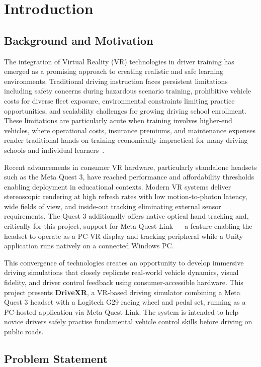 \chapter{Introduction}{\label{ch:intro}}
\section{Background and Motivation}

The integration of Virtual Reality (VR) technologies in driver training has emerged as a promising approach to creating realistic and safe learning environments. Traditional driving instruction faces persistent limitations including safety concerns during hazardous scenario training, prohibitive vehicle costs for diverse fleet exposure, environmental constraints limiting practice opportunities, and scalability challenges for growing driving school enrollment. These limitations are particularly acute when training involves higher-end vehicles, where operational costs, insurance premiums, and maintenance expenses render traditional hands-on training economically impractical for many driving schools and individual learners~\cite{Harari2021}.

Recent advancements in consumer VR hardware, particularly standalone headsets such as the Meta Quest 3, have reached performance and affordability thresholds enabling deployment in educational contexts. Modern VR systems deliver stereoscopic rendering at high refresh rates with low motion-to-photon latency, wide fields of view, and inside-out tracking eliminating external sensor requirements. The Quest 3 additionally offers native optical hand tracking and, critically for this project, support for Meta Quest Link — a feature enabling the headset to operate as a PC-VR display and tracking peripheral while a Unity application runs natively on a connected Windows PC.

This convergence of technologies creates an opportunity to develop immersive driving simulations that closely replicate real-world vehicle dynamics, visual fidelity, and driver control feedback using consumer-accessible hardware. This project presents \textbf{DriveXR}, a VR-based driving simulator combining a Meta Quest 3 headset with a Logitech G29 racing wheel and pedal set, running as a PC-hosted application via Meta Quest Link. The system is intended to help novice drivers safely practise fundamental vehicle control skills before driving on public roads.

\section{Problem Statement}


